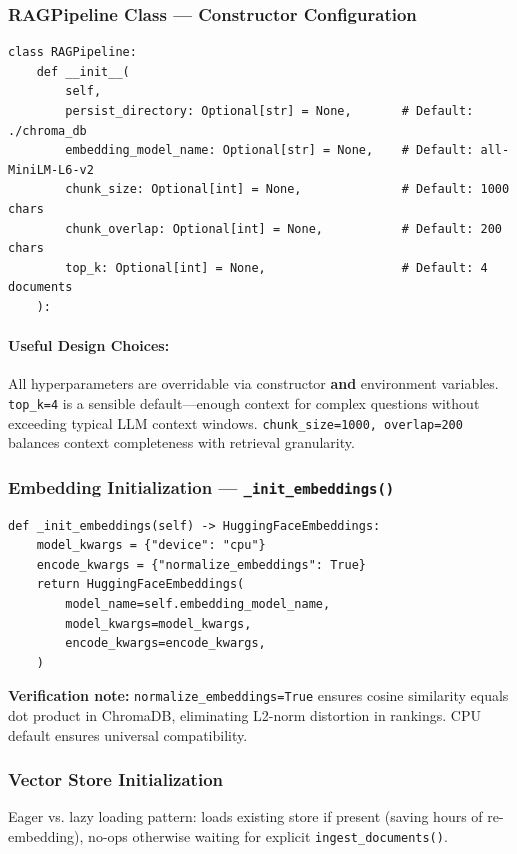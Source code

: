 \documentclass[12pt,a4paper]{article}
\begin{document}
\subsubsection{RAGPipeline Class — Constructor Configuration}

\begin{lstlisting}
class RAGPipeline:
    def __init__(
        self,
        persist_directory: Optional[str] = None,       # Default: ./chroma_db
        embedding_model_name: Optional[str] = None,    # Default: all-MiniLM-L6-v2
        chunk_size: Optional[int] = None,              # Default: 1000 chars
        chunk_overlap: Optional[int] = None,           # Default: 200 chars
        top_k: Optional[int] = None,                   # Default: 4 documents
    ):
\end{lstlisting}

\paragraph{Useful Design Choices:}
All hyperparameters are overridable via constructor \textbf{and} environment variables. \texttt{top\_k=4} is a sensible default—enough context for complex questions without exceeding typical LLM context windows. \texttt{chunk\_size=1000, overlap=200} balances context completeness with retrieval granularity.

\subsubsection{Embedding Initialization — \texttt{\_init\_embeddings()}}

\begin{lstlisting}
def _init_embeddings(self) -> HuggingFaceEmbeddings:
    model_kwargs = {"device": "cpu"}
    encode_kwargs = {"normalize_embeddings": True}
    return HuggingFaceEmbeddings(
        model_name=self.embedding_model_name,
        model_kwargs=model_kwargs,
        encode_kwargs=encode_kwargs,
    )
\end{lstlisting}

\textbf{Verification note:} \texttt{normalize\_embeddings=True} ensures cosine similarity equals dot product in ChromaDB, eliminating L2-norm distortion in rankings. CPU default ensures universal compatibility.

\subsubsection{Vector Store Initialization}
Eager vs. lazy loading pattern: loads existing store if present (saving hours of re-embedding), no-ops otherwise waiting for explicit \texttt{ingest\_documents()}.
\end{document}
